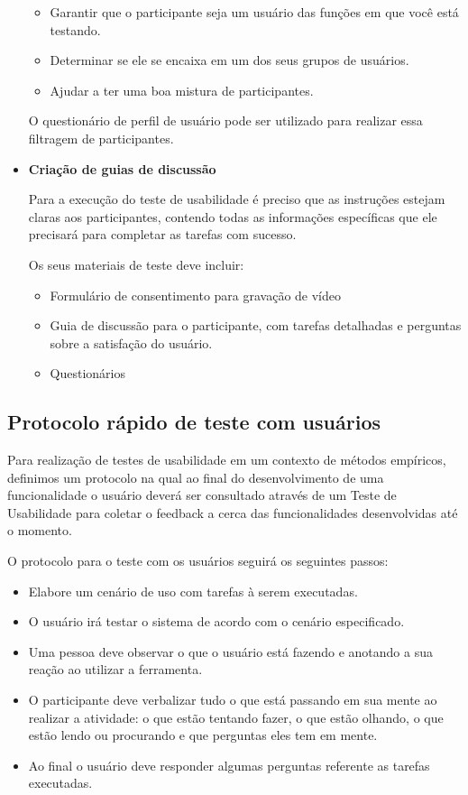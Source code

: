 \begin{itemize}
	\begin{itemize}
	\item Garantir que o participante seja um usuário das funções em que você está testando.
	\item Determinar se ele se encaixa em um dos seus grupos de usuários.
	\item Ajudar a ter uma boa mistura de participantes.
	\end{itemize}	

O questionário de perfil de usuário pode ser utilizado para realizar essa filtragem de participantes.


\item \textbf{Criação de guias de discussão}

Para a execução do teste de usabilidade é preciso que as instruções estejam claras aos participantes, contendo todas as informações específicas que ele precisará para completar as tarefas com sucesso.

Os seus materiais de teste deve incluir:

		\begin{itemize}
		\item Formulário de consentimento para gravação de vídeo
		\item Guia de discussão para o participante, com tarefas detalhadas e perguntas sobre a satisfação do usuário.
		\item Questionários
		\end{itemize}
		
\end{itemize}

\subsection{Protocolo rápido de teste com usuários}

Para realização de testes de usabilidade em um contexto de métodos empíricos, definimos um protocolo na qual ao final do desenvolvimento de uma funcionalidade o usuário deverá ser consultado através de um Teste de Usabilidade para coletar o feedback a cerca das funcionalidades desenvolvidas até o momento. 

O protocolo para o teste com os usuários seguirá os seguintes passos:

\begin{itemize}
\item Elabore um cenário de uso com tarefas à serem executadas.
\item O usuário irá testar o sistema de acordo com o cenário especificado.
\item Uma pessoa deve observar o que o usuário está fazendo e anotando a sua reação ao utilizar a ferramenta.
\item O participante deve verbalizar tudo o que está passando em sua mente ao realizar a atividade: o que estão tentando fazer, o que estão olhando, o que estão lendo ou procurando e que perguntas eles tem em mente.
\item Ao final o usuário deve responder algumas perguntas referente as tarefas executadas.
\end{itemize}


